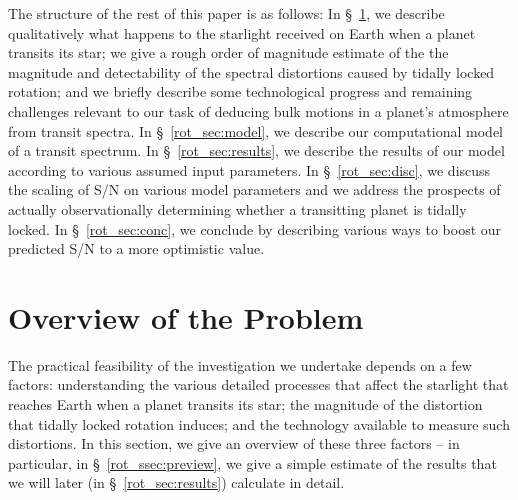 The structure of the rest of this paper is as follows: In
\S~\ref{rot_sec:overview}, we describe qualitatively what happens to
the starlight received on Earth when a planet transits its star; we
give a rough order of magnitude estimate of the the magnitude and
detectability of the spectral distortions caused by tidally locked
rotation; and we briefly describe some technological progress and
remaining challenges relevant to our task of deducing bulk motions in
a planet's atmosphere from transit spectra.  In
\S~\ref{rot_sec:model}, we describe our computational model of a
transit spectrum.  In \S~\ref{rot_sec:results}, we describe the
results of our model according to various assumed input parameters.
In \S~\ref{rot_sec:disc}, we discuss the scaling of S/N on various
model parameters and we address the prospects of actually
observationally determining whether a transitting planet is tidally
locked.  In \S~\ref{rot_sec:conc}, we conclude by describing various
ways to boost our predicted S/N to a more optimistic value.



\section{Overview of the Problem}
\label{rot_sec:overview}

The practical feasibility of the investigation we undertake depends on
a few factors: understanding the various detailed processes that
affect the starlight that reaches Earth when a planet transits its
star; the magnitude of the distortion that tidally locked rotation
induces; and the technology available to measure such distortions.  In
this section, we give an overview of these three factors -- in
particular, in \S~\ref{rot_ssec:preview}, we give a simple estimate of
the results that we will later (in \S~\ref{rot_sec:results}) calculate
in detail.

